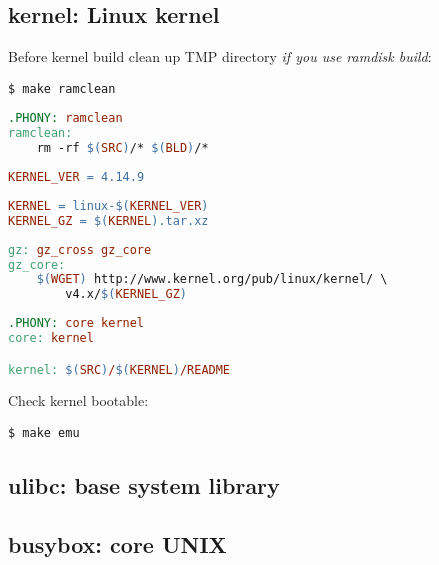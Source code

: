 \subsection{kernel: Linux kernel}

Before kernel build clean up TMP directory \emph{if you use ramdisk build}:
\begin{lstlisting}
$ make ramclean
\end{lstlisting}
\begin{lstlisting}[language=make,title=Makefile]
.PHONY: ramclean
ramclean:
	rm -rf $(SRC)/* $(BLD)/*
\end{lstlisting}

\begin{lstlisting}[language=make,title=mk/version]
KERNEL_VER = 4.14.9
\end{lstlisting}
\begin{lstlisting}[language=make,title=mk/package]
KERNEL = linux-$(KERNEL_VER)
KERNEL_GZ = $(KERNEL).tar.xz
\end{lstlisting}
\begin{lstlisting}[language=make,title=mk/gz]
gz: gz_cross gz_core
gz_core:
	$(WGET) http://www.kernel.org/pub/linux/kernel/ \
		v4.x/$(KERNEL_GZ)
\end{lstlisting}
\begin{lstlisting}[language=make,title=mk/core]
.PHONY: core kernel
core: kernel

kernel: $(SRC)/$(KERNEL)/README
\end{lstlisting}

Check kernel bootable:
\begin{lstlisting}
$ make emu
\end{lstlisting}

\subsection{ulibc: base system library}

\subsection{busybox: core UNIX}

